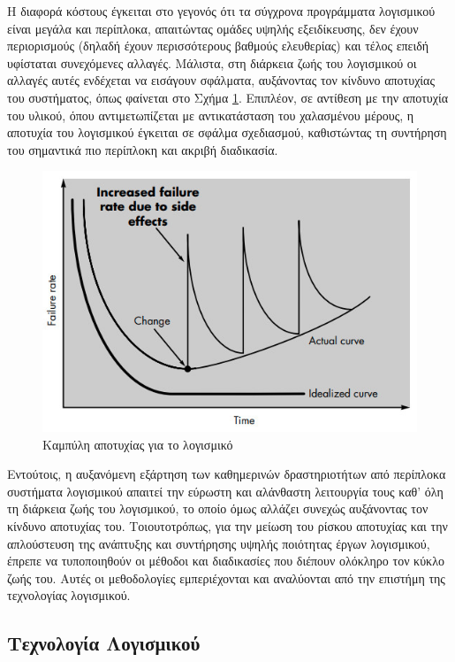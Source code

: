 Η διαφορά κόστους έγκειται στο γεγονός ότι τα σύγχρονα προγράμματα λογισμικού είναι μεγάλα και περίπλοκα, απαιτώντας ομάδες υψηλής εξειδίκευσης, δεν έχουν περιορισμούς (δηλαδή έχουν περισσότερους βαθμούς ελευθερίας) και τέλος επειδή υφίσταται συνεχόμενες αλλαγές. Μάλιστα, στη διάρκεια ζωής του λογισμικού οι αλλαγές αυτές ενδέχεται να εισάγουν σφάλματα, αυξάνοντας τον κίνδυνο αποτυχίας του συστήματος, όπως φαίνεται στο Σχήμα \ref{fig:software_failure_rate}. Επιπλέον, σε αντίθεση με την αποτυχία του υλικού, όπου αντιμετωπίζεται με αντικατάσταση του χαλασμένου μέρους, η αποτυχία του λογισμικού έγκειται σε σφάλμα σχεδιασμού, καθιστώντας τη συντήρηση του σημαντικά πιο περίπλοκη και ακριβή διαδικασία.

\begin{figure}[h]
    \centering
    \includegraphics[scale=2.2]{images/chapter2/software_engineering/software_failure_rate.jpg}
    \caption{Καμπύλη αποτυχίας για το λογισμικό}
    \label{fig:software_failure_rate}
\end{figure}

Εντούτοις, η αυξανόμενη εξάρτηση των καθημερινών δραστηριοτήτων από περίπλοκα συστήματα λογισμικού απαιτεί την εύρωστη και αλάνθαστη λειτουργία τους καθ' όλη τη διάρκεια ζωής του λογισμικού, το οποίο όμως αλλάζει συνεχώς αυξάνοντας τον κίνδυνο αποτυχίας του. Τοιουτοτρόπως, για την μείωση του ρίσκου αποτυχίας και την απλούστευση της ανάπτυξης και συντήρησης υψηλής ποιότητας έργων λογισμικού, έπρεπε να τυποποιηθούν οι μέθοδοι και διαδικασίες που διέπουν ολόκληρο τον κύκλο ζωής του. Αυτές οι μεθοδολογίες εμπεριέχονται και αναλύονται από την επιστήμη της τεχνολογίας λογισμικού.

\subsection{Τεχνολογία Λογισμικού}

